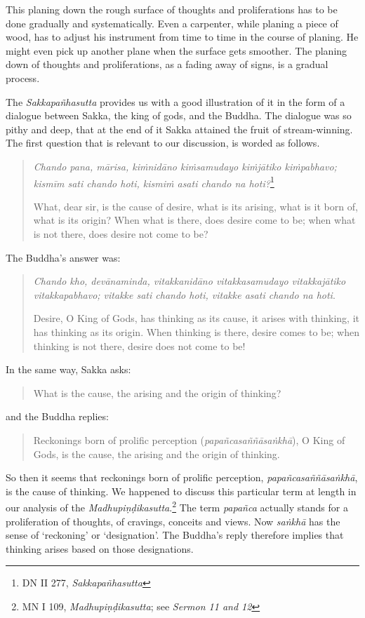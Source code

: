 This planing down the rough surface of thoughts and proliferations has to be done gradually and systematically. Even a carpenter, while planing a piece of wood, has to adjust his instrument from time to time in the course of planing. He might even pick up another plane when the surface gets smoother. The planing down of thoughts and proliferations, as a fading away of signs, is a gradual process.

The \emph{Sakkapañhasutta} provides us with a good illustration of it in the form of a dialogue between Sakka, the king of gods, and the Buddha. The dialogue was so pithy and deep, that at the end of it Sakka attained the fruit of stream-winning. The first question that is relevant to our discussion, is worded as follows.

\begin{quote}
\emph{Chando pana, mārisa, kiṁnidāno kiṁsamudayo kiṁjātiko kiṁpabhavo; kismīm sati chando hoti, kismiṁ asati chando na hoti?}\footnote{DN II 277, \emph{Sakkapañhasutta}}

What, dear sir, is the cause of desire, what is its arising, what is it born of, what is its origin? When what is there, does desire come to be; when what is not there, does desire not come to be?
\end{quote}

The Buddha's answer was:

\begin{quote}
\emph{Chando kho, devānaminda, vitakkanidāno vitakkasamudayo vitakkajātiko vitakkapabhavo; vitakke sati chando hoti, vitakke asati chando na hoti}.

Desire, O King of Gods, has thinking as its cause, it arises with thinking, it has thinking as its origin. When thinking is there, desire comes to be; when thinking is not there, desire does not come to be!
\end{quote}

In the same way, Sakka asks:

\begin{quote}
What is the cause, the arising and the origin of thinking?
\end{quote}

and the Buddha replies:

\begin{quote}
Reckonings born of prolific perception (\emph{papañcasaññāsaṅkhā}), O King of Gods, is the cause, the arising and the origin of thinking.
\end{quote}

So then it seems that reckonings born of prolific perception, \emph{papañcasaññāsaṅkhā}, is the cause of thinking. We happened to discuss this particular term at length in our analysis of the \emph{Madhupiṇḍikasutta}.\footnote{MN I 109, \emph{Madhupiṇḍikasutta}; see \emph{Sermon 11 and 12}} The term \emph{papañca} actually stands for a proliferation of thoughts, of cravings, conceits and views. Now \emph{saṅkhā} has the sense of `reckoning' or `designation'. The Buddha's reply therefore implies that thinking arises based on those designations.

